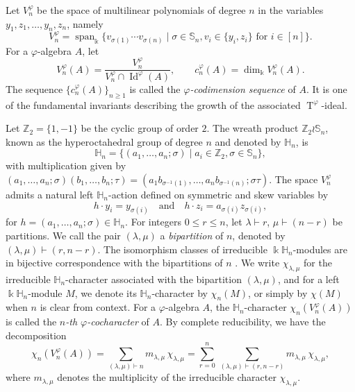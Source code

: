 \documentclass{amsart}
\theoremstyle{definition}
\theoremstyle{remark}
\numberwithin{equation}{section}
\def \la{\lambda}
\def \si{\sigma}
\def \vp{\varphi}
\def \k{\Bbbk}
\def \H{\mathbb{H}}
\def \S{\mathbb{S}}
\def \Z{\mathbb{Z}}
\def \Id{\operatorname{Id}}
\def \sp{\operatorname{span}}
\def \T{\operatorname{T}}
\begin{document}
	Let $V_n^\vp$ be the space of multilinear polynomials of degree $n$ in the variables $y_1, z_1, \dots, y_n, z_n$, namely
	\[
	V_n^\vp = \sp_\k \{ v_{\si(1)} \cdots v_{\si(n)} \mid \si \in \S_n, v_i \in \{y_i, z_i\} \text{ for } i \in [n] \}.
	\]
	For a $\vp$-algebra $A$, let
	\[
	V_n^\vp(A) = \frac{V_n^\vp}{V_n^\vp \cap \Id^\vp(A)},
	\qquad
	c_n^\vp(A) = \dim_\k V_n^\vp(A).
	\]
	The sequence $\{c_n^\vp(A)\}_{n \geq 1}$ is called the \emph{$\vp$-codimension sequence} of $A$. It is one of the fundamental invariants describing the growth of the associated $\T^\vp$-ideal.  
	
	Let $\Z_2 = \{1, -1\}$ be the cyclic group of order $2$. The wreath product $\Z_2 \wr \S_n$, known as the hyperoctahedral group of degree $n$ and denoted by $\H_n$, is 
	\[
	\H_n = \{(a_1, \dots, a_n; \si) \mid a_i \in \Z_2, \si \in \S_n\},
	\]
	with multiplication given by $(a_1, \dots, a_n; \si)(b_1, \dots, b_n; \tau) = (a_1 b_{\si^{-1}(1)}, \dots, a_n b_{\si^{-1}(n)}; \si \tau)$. The space $V_n^\vp$ admits a natural left $\H_n$-action defined on symmetric and skew variables by
	\[
	h \cdot y_i = y_{\si(i)} \quad \text{and} \quad h \cdot z_i = a_{\si(i)} z_{\si(i)},
	\]
	for $h = (a_1, \dots, a_n; \si) \in \H_n$. For integers $0 \leq r \leq n$, let $\la \vdash r$, $\mu \vdash (n-r)$ be partitions. We call the pair $(\la, \mu)$ a \emph{bipartition} of $n$, denoted by $(\la, \mu) \vdash (r, n-r)$. The isomorphism classes of irreducible $\k\H_n$-modules are in bijective correspondence with the bipartitions of $n$ \cite[Subsection 10.6]{GZ}. We write $\chi_{\la,\mu}$ for the irreducible $\H_n$-character associated with the bipartition $(\la,\mu)$, and for a left $\k \H_n$-module $M$, we denote its $\H_n$-character by $\chi_n(M)$, or simply by $\chi(M)$ when $n$ is clear from context. For a $\vp$-algebra $A$, the $\H_n$-character $\chi_n(V_n^\vp(A))$ is called the \emph{$n$-th $\vp$-cocharacter} of $A$. By complete reducibility, we have the decomposition
	\begin{equation} \label{1.0.1} \tag{E1.0.1}
		\chi_n(V_n^\vp(A)) = \sum_{(\la,\mu) \vdash n} m_{\la,\mu} \, \chi_{\la,\mu} = \sum_{r=0}^{n} \, \sum_{(\la,\mu) \vdash (r,n-r)}^{} m_{\la,\mu} \, \chi_{\la,\mu},
	\end{equation}
	where $m_{\lambda,\mu}$ denotes the multiplicity of the irreducible character $\chi_{\lambda,\mu}$.
	
\end{document}
